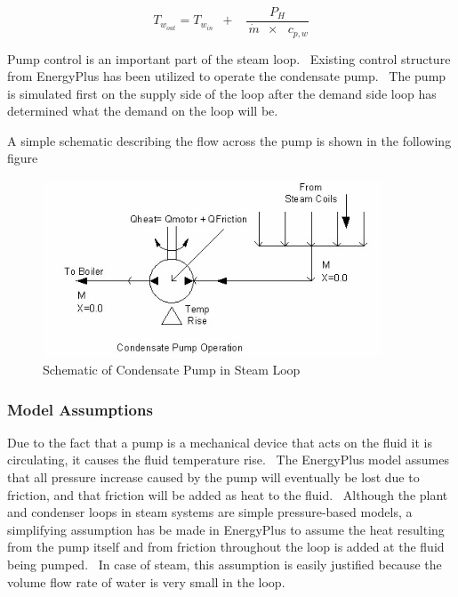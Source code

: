\begin{equation}
{T_{{w_{out}}}} = {T_{{w_{in}}}}\,\,\, + \,\,\,\,\,\frac{{{P_H}}}{{\,\dot m\,\,\, \times \,\,\,\,{c_{p,w}}}}
\end{equation}

Pump control is an important part of the steam loop.~ Existing control structure from EnergyPlus has been utilized to operate the condensate pump.~ The pump is simulated first on the supply side of the loop after the demand side loop has determined what the demand on the loop will be.

A simple schematic describing the flow across the pump is shown in the following figure

\begin{figure}[hbtp] %
\centering
\includegraphics[width=0.9\textwidth, height=0.9\textheight, keepaspectratio=true]{media/image2040.png}
\caption{Schematic of Condensate Pump in Steam Loop \protect \label{fig:schematic-of-condensate-pump-in-steam-loop}}
\end{figure}

\subsubsection{Model Assumptions}\label{model-assumptions-1}

Due to the fact that a pump is a mechanical device that acts on the fluid it is circulating, it causes the fluid temperature rise.~ The EnergyPlus model assumes that all pressure increase caused by the pump will eventually be lost due to friction, and that friction will be added as heat to the fluid.~ Although the plant and condenser loops in steam systems are simple pressure-based models, a simplifying assumption has be made in EnergyPlus to assume the heat resulting from the pump itself and from friction throughout the loop is added at the fluid being pumped.~ In case of steam, this assumption is easily justified because the volume flow rate of water is very small in the loop.

